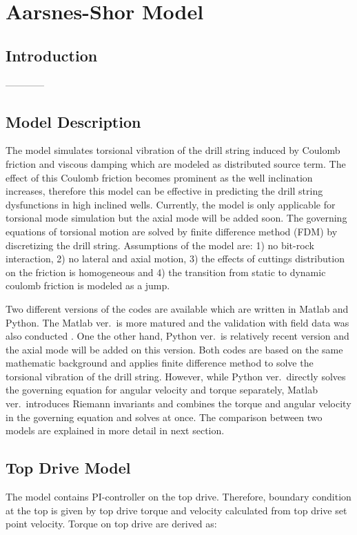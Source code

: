 \chapter{Aarsnes-Shor Model}
\label{ch:aarnessshormodel}

\section{Introduction}
------------

\section{Model Description}
The model simulates torsional vibration of the drill string induced by Coulomb friction and viscous damping which are modeled as distributed source term. The effect of this Coulomb friction becomes prominent as the well inclination increases, therefore this model can be effective in predicting the drill string dysfunctions in high inclined wells. Currently, the model is only applicable for torsional mode simulation but the axial mode will be added soon. The governing equations of torsional motion are solved by finite difference method (FDM) by discretizing the drill string. Assumptions of the model are: 1) no bit-rock interaction, 2) no lateral and axial motion, 3) the effects of cuttings distribution on the friction is homogeneous and 4) the transition from static to dynamic coulomb friction is modeled as a jump. 

Two different versions of the codes are available which are written in Matlab and Python. The Matlab ver.\ is more matured and the validation with field data was also conducted \cite{ref:aarsnes2017a}. One the other hand, Python ver.\ is relatively recent version and the axial mode will be added on this version. Both codes are based on the same mathematic background and applies finite difference method to solve the torsional vibration of the drill string. However, while Python ver.\ directly solves the governing equation for angular velocity and torque separately, Matlab ver.\ introduces Riemann invariants and combines the torque and angular velocity in the governing equation and solves at once. The comparison between two models are explained in more detail in next section. 

\section{Top Drive Model}
The model contains PI-controller on the top drive. Therefore, boundary condition at the top is given by top drive torque and velocity calculated from top drive set point velocity. Torque on top drive are derived as:

